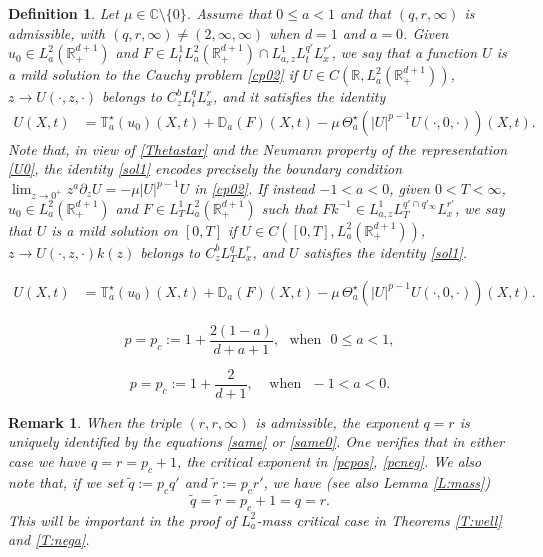 \documentclass[10pt,a4paper]{amsart}
\newtheorem{remark}{Remark}
\newtheorem{definition}{Definition}
\newcommand{\C}{\mathbb{C}}
\def \R {\mathbb{R}}
\def \RN {\mathbb{R}_+^{d+1}}
\newcommand{\p}{\partial}
\begin{document}
\begin{definition}\label{solution}
Let $\mu\in \C\setminus\{0\}$. Assume that $0\le a<1$ and that $(q,r,\infty)$ is admissible, with $(q,r,\infty)\not= (2,\infty,\infty)$ when $d=1$ and $a = 0$. Given $u_0\in L^2_a(\RN)$ and $F\in L^1_t L^2_a(\RN) \cap L^1_{a,z} L_t^{q'} L^{r'}_x$, we say that a function $U$ is a \emph{mild solution} to the Cauchy problem \eqref{cp02} if $U\in C(\R,L^2_a(\RN))$, $z\to U(\cdot,z,\cdot)$ belongs to $C^b_z L^q_tL^r_x$, and it satisfies the identity 
\begin{align}\label{sol1}
U(X,t) & = \mathbb T^\star_a(u_0)(X,t) +  \mathbb D_a(F)(X,t) - \mu\, \Theta^\star_a(|U|^{p-1} U(\cdot,0,\cdot))(X,t).
\end{align}
Note that, in view of \eqref{Thetastar} and the Neumann property of the representation \eqref{U0}, the identity \eqref{sol1} encodes precisely the boundary condition $\lim_{z\to 0^+} z^a\p_z U = -\mu|U|^{p-1}U$ in \eqref{cp02}.
If instead $-1<a<0$, given $0<T<\infty$, $u_0\in L^2_a(\RN)$ and $F\in L^1_T L^2_a(\RN)$ such that 
$F  k^{-1}\in L^1_{a,z} L^{q'\cap q'_\infty}_T L^{r'}_x $, we say that $U$ is a \emph{mild solution} on $[0,T]$ if $U\in C([0,T],L^2_a(\RN))$, $z \to U(\cdot,z,\cdot)k(z)$ belongs to $C^b_z L^q_T L^r_x$, and $U$ satisfies the identity \eqref{sol1}.
\end{definition} 

\begin{align}
U(X,t) & = \mathbb T^\star_a(u_0)(X,t) +  \mathbb D_a(F)(X,t) - \mu\, \Theta^\star_a(|U|^{p-1} U(\cdot,0,\cdot))(X,t).
\end{align}

\begin{equation}\label{pcpos}
p = p_c := 1 + \frac{2(1-a)}{d+a+1},\ \ \ \text{when}\ \ \ 0\le a<1,  
\end{equation}

\begin{equation}\label{pcneg}
p = p_c := 1 + \frac{2}{d+1},\ \ \ \ \ \text{when}\ \ \ -1<a<0.
\end{equation}

\begin{remark}\label{R:pc}
When the triple $(r,r,\infty)$ is admissible, the exponent $q=r$ is uniquely identified by the equations \eqref{same} or \eqref{same0}. One verifies that in either case we have $q=r = p_c+1$, the critical exponent in \eqref{pcpos}, \eqref{pcneg}. We also note that, if we set $\tilde q := p_c q'$ and $\tilde r := p_c r' $, we have (see also Lemma \ref{L:mass})
\[
\tilde q = \tilde r = p_c+1 = q = r.
\]
This will be important in the proof of $L^2_a$-mass critical case in Theorems \ref{T:well} and \ref{T:nega}.
\end{remark}
\end{document}

